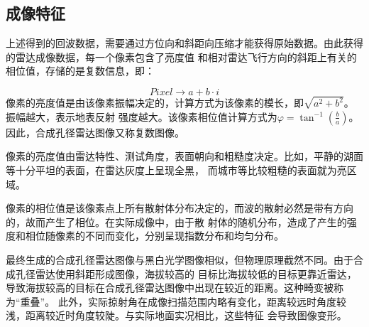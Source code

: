 \documentclass{xduugthesis}
\begin{document}
\subsection{成像特征}
上述得到的回波数据，需要通过方位向和斜距向压缩才能获得原始数据。由此获得的雷达成像数据，每一个像素包含了亮度值
和相对雷达飞行方向的斜距上有关的相位值，存储的是复数信息\cite{SAR_Pixel}，即：\par
\begin{equation}Pixel\rightarrow a+b \cdot i\end{equation}
像素的亮度值是由该像素振幅决定的，计算方式为该像素的模长，即$\sqrt{a^2+b^2}$。振幅越大，表示地表反射
强度越大。该像素相位值计算方式为$\varphi = \tan^{-1}(\frac{b}{a})$。因此，合成孔径雷达图像又称复数图像。\par
像素的亮度值由雷达特性、测试角度，表面朝向和粗糙度决定。比如，平静的湖面等十分平坦的表面，在雷达灰度上呈现全黑，
而城市等比较粗糙的表面就为亮区域。\par
像素的相位值是该像素点上所有散射体分布决定的，而波的散射必然是带有方向的，故而产生了相位。在实际成像中，由于散
射体的随机分布，造成了产生的强度和相位随像素的不同而变化，分别呈现指数分布和均匀分布。\par
最终生成的合成孔径雷达图像与黑白光学图像相似，但物理原理截然不同。由于合成孔径雷达使用斜距形成图像，海拔较高的
目标比海拔较低的目标更靠近雷达，导致海拔较高的目标在合成孔径雷达图像中出现在较近的距离。这种畸变被称为“重叠”。
此外，实际掠射角在成像扫描范围内略有变化，距离较远时角度较浅，距离较近时角度较陡。与实际地面实况相比，这些特征
会导致图像变形。\par
\end{document}
